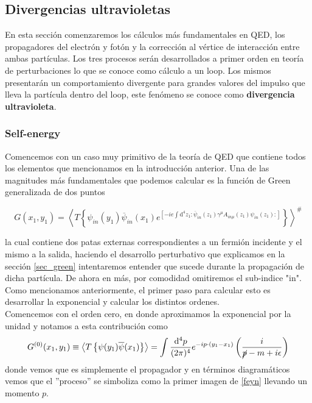 \documentclass[tickz]{article}
\numberwithin{equation}{section}
\begin{document}
\subsection{Divergencias ultravioletas}

En esta sección comenzaremos los cálculos más fundamentales en QED, los propagadores del electrón y fotón y la corrección al vértice de interacción entre ambas partículas. Los tres procesos serán desarrollados a primer orden en teoría de perturbaciones lo que se conoce como cálculo a un loop. Los mismos presentarán un comportamiento divergente para grandes valores del impulso que lleva la partícula dentro del loop, este fenómeno se conoce como \textbf{divergencia ultravioleta}. 

\subsubsection{Self-energy}

Comencemos con un caso muy primitivo de la teoría de QED que contiene todos los elementos que mencionamos en la introducción anterior. Una de las magnitudes más fundamentales que podemos calcular es la función de Green generalizada de dos puntos 

\begin{equation}\label{qedgreen}
G(x_{1},y_{1})=\left\langle T\left\{ \psi_{in}(y_{1})\overline{\psi}_{in}(x_{1})e^{\left[-ie\int \mathrm{\mathrm{d^4}}z_{1}:\overline{\psi}_{in}(z_{1})\gamma^{\mu}A_{ in \mu}(z_{1})\psi_{in}(z_{1}):\right]}\right\} \right\rangle ^{\#}
\end{equation}

la cual contiene dos patas externas correspondientes a un fermión incidente y el mismo a la salida, haciendo el desarrollo perturbativo que explicamos en la sección \ref{sec_green} intentaremos entender que sucede durante la propagación de dicha partícula. De ahora en más, por comodidad omitiremos el sub-indice "in".
Como mencionamos anteriormente,
el primer paso para calcular esto es desarrollar la exponencial y
calcular los distintos ordenes.\\

Comencemos con el orden cero, en donde
aproximamos la exponencial por la unidad y notamos a esta contribución
como 
\begin{equation}\label{g0}
G^{(0)}(x_{1},y_{1}) \equiv \left\langle T\left\{ \psi(y_{1})\overline{\psi}(x_{1})\right\} \right\rangle =\int\frac{\mathrm{\mathrm{d^4}}p}{(2\pi)^{4}}e^{-ip\cdot(y_{1}-x_{1})}\left(\frac{i}{\cancel{p}-m+i\epsilon}\right)
\end{equation}
donde vemos que es simplemente el propagador y en términos diagramáticos
vemos que el ''proceso'' se simboliza como la primer imagen de \ref{feyn} llevando un momento $ p $.
\end{document}
